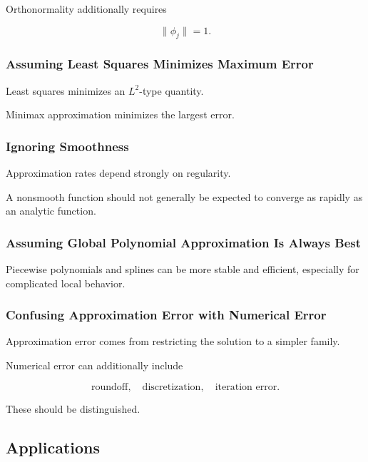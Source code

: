 Orthonormality additionally requires

\[
\boxed{
\|\phi_j\|=1.
}
\]

\subsubsection{Assuming Least Squares Minimizes Maximum Error}

Least squares minimizes an \(L^2\)-type quantity.

Minimax approximation minimizes the largest error.

\subsubsection{Ignoring Smoothness}

Approximation rates depend strongly on regularity.

A nonsmooth function should not generally be expected to converge as
rapidly as an analytic function.

\subsubsection{Assuming Global Polynomial Approximation Is Always Best}

Piecewise polynomials and splines can be more stable and efficient,
especially for complicated local behavior.

\subsubsection{Confusing Approximation Error with Numerical Error}

Approximation error comes from restricting the solution to a simpler
family.

Numerical error can additionally include

\[
\boxed{
\text{roundoff},
\quad
\text{discretization},
\quad
\text{iteration error}.
}
\]

These should be distinguished.

\subsection{Applications}
\label{subsec:approximation-theory-applications}

